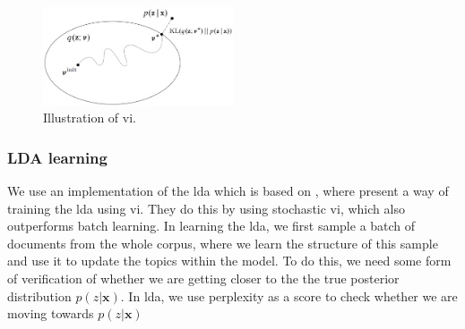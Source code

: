 \begin{figure}
	\centering
	\includegraphics[width=0.5\textwidth]{figures/vi_illustration.png}
	\caption[Caption for LOF]{Illustration of \acrlong{vi}\footnotemark.}
	\label{fig:vi}
\end{figure}

\subsubsection*{LDA learning}
We use an implementation of the \gls{lda} which is based on \cite{blei2010online}, where \citeauthor{blei2010online} present a way of training the \gls{lda} using \gls{vi}.
They do this by using stochastic \gls{vi}, which also outperforms batch learning.
In learning the \gls{lda}, we first sample a batch of documents from the whole corpus, where we learn the structure of this sample and use it to update the topics within the model.
To do this, we need some form of verification of whether we are getting closer to the the true posterior distribution $p(z|\textbf{x})$.
In \gls{lda}, we use perplexity as a score to check whether we are moving towards $p(z|\textbf{x})$


